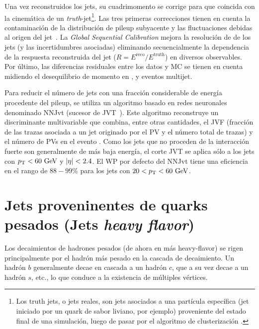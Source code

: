 Una vez reconstruidos los jets, su cuadrimomento se corrige para que coincida con la cinemática de un \textit{truth}-jet\footnote{Los truth jets, o jets reales, son jets asociados a una part\'icula espec\'ifica (jet iniciado por un quark de sabor liviano, por ejemplo) proveniente del estado final de una simulaci\'on, luego de pasar por el algoritmo de clusterizaci\'on \antikt.}. Las tres primeras correcciones tienen en cuenta la contaminación de la distribución de pileup subyacente y las fluctuaciones debidas al origen del jet~\cite{ATLAS-Jet-Calibration-Run2}. La \textit{Global Sequential Calibration} mejora la resolución de \pt de los jets (y las incertidumbres asociadas) eliminando secuencialmente la dependencia de la respuesta reconstruida del jet (\(R= E^{\text{reco}} / E^{\text{truth}}\)) en diversos observables. Por último, las diferencias residuales entre los datos y \ac{MC} se tienen en cuenta midiendo el desequilibrio de momento en \Zjets, \gammajet y eventos multijet.

Para reducir el número de jets con una fracción considerable de energía procedente del pileup, se utiliza un algoritmo basado en redes neuronales denominado \ac{NNJvt} (sucesor de \ac{JVT}~\cite{ATLAS-JetPileup-Run1}). Este algoritmo reconstruye un discriminante multivariable que combina, entre otras cantidades, el \ac{JVF} (fracción de las trazas \pt asociada a un jet originado por el \ac{PV} y el número total de trazas) y el número de \acp{PV} en el evento \Npv. Como los jets que no proceden de la interacción fuerte son generalmente de m\'as baja energ\'ia, el corte \ac{JVT} se aplica sólo a los jets con \(p_{\text{T}}<60~\text{GeV}\) y \(|\eta|<2.4\). El \ac{WP} por defecto del \ac{NNJvt} tiene una eficiencia en el rango de \(88-99\%\) para los jets con \(20<p_{\text{T}}<60~\text{GeV}\).


















\section{Jets proveninentes de quarks pesados (Jets \textit{heavy flavor})}
\label{sec:objects:ftag}

Los decaimientos de hadrones pesados (de ahora en m\'as heavy-flavor) se rigen principalmente por el hadrón más pesado en la cascada de decaimiento. Un hadrón \(b\) generalmente decae en cascada a un hadrón \(c\), que a su vez decae a un hadrón \(s\), etc., lo que conduce a la existencia de múltiples vértices.

